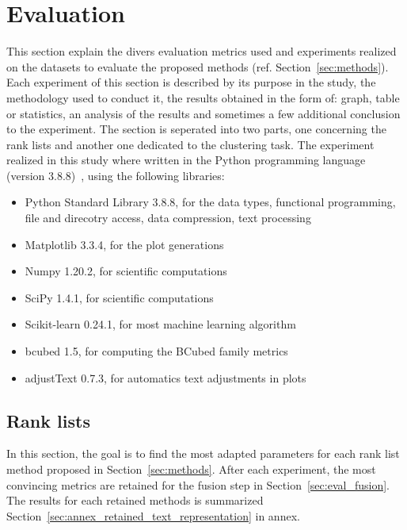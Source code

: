 \section{Evaluation \label{sec:evaluation}}

This section explain the divers evaluation metrics used and experiments realized on the datasets to evaluate the proposed methods (ref. Section~\ref{sec:methods}).
Each experiment of this section is described by its purpose in the study, the methodology used to conduct it, the results obtained in the form of: graph, table or statistics, an analysis of the results and sometimes a few additional conclusion to the experiment.
The section is seperated into two parts, one concerning the rank lists and another one dedicated to the clustering task.
The experiment realized in this study where written in the Python programming language (version 3.8.8)~\cite{python}, using the following libraries:
\begin{itemize}
  \item Python Standard Library 3.8.8, for the data types, functional programming, file and direcotry access, data compression, text processing~\cite{python_standard_library}
  \item Matplotlib 3.3.4, for the plot generations~\cite{matplotlib}
  \item Numpy 1.20.2, for scientific computations~\cite{numpy}
  \item SciPy 1.4.1, for scientific computations~\cite{scipy}
  \item Scikit-learn 0.24.1, for most machine learning algorithm~\cite{sklearn}
  \item bcubed 1.5, for computing the BCubed family metrics~\cite{bcubed_gh}
  \item adjustText 0.7.3, for automatics text adjustments in plots~\cite{adjustText}
\end{itemize}

\subsection{Rank lists \label{sec:eval_rl}}

In this section, the goal is to find the most adapted parameters for each rank list method proposed in Section~\ref{sec:methods}.
After each experiment, the most convincing metrics are retained for the fusion step in Section~\ref{sec:eval_fusion}.
The results for each retained methods is summarized Section~\ref{sec:annex_retained_text_representation} in annex.

